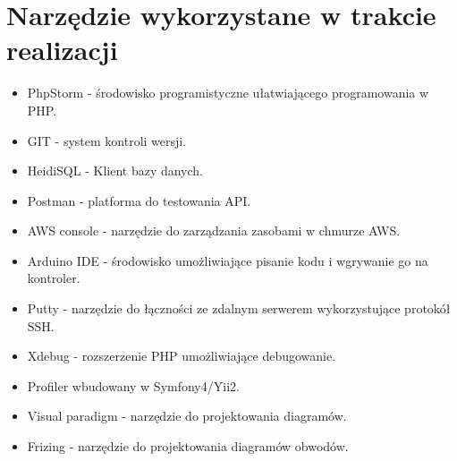 \documentclass[declaration,shortabstract, mgr]{iithesis}
\begin{document}
\section{Narzędzie wykorzystane w trakcie realizacji}\label{a:narzedzia}
\begin{itemize}
\item PhpStorm - środowisko programistyczne ułatwiającego programowania w PHP.
\item GIT - system kontroli wersji.
\item HeidiSQL - Klient bazy danych.
\item Postman - platforma do testowania API.
\item AWS console - narzędzie do zarządzania zasobami w chmurze AWS.
\item Arduino IDE - środowisko umożliwiające pisanie kodu i wgrywanie go na kontroler.
\item Putty - narzędzie do łączności ze zdalnym serwerem wykorzystujące protokół SSH.
\item Xdebug - rozszerzenie PHP umożliwiające debugowanie.
\item Profiler wbudowany w Symfony4/Yii2.
\item Visual paradigm - narzędzie do projektowania diagramów.
\item Frizing - narzędzie do projektowania diagramów obwodów.
\end{itemize}
\end{document}
